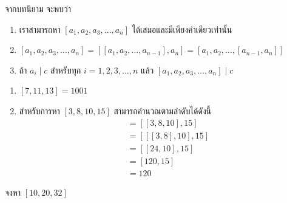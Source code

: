 จากบทนิยาม จะพบว่า
\begin{enumerate}
	\item เราสามารถหา $[a_1, a_2, a_3, \ldots, a_n]$ ได้เสมอและมีเพียงค่าเดียวเท่านั้น
	\item $[a_1, a_2, a_3, \ldots, a_n] = [[a_1, a_2, \ldots, a_{n-1}], a_n] = [a_1, a_2, \ldots, [a_{n-1}, a_n]]$
	\item ถ้า $a_i \mid c$ สำหรับทุก $i = 1, 2, 3, \ldots, n$ แล้ว $[a_1, a_2, a_3, \ldots, a_n] \mid c$
\end{enumerate}

\begin{examplebox}
	\begin{enumerate}
		\item $[7, 11, 13] = 1001$
		\item สำหรับการหา $[3, 8, 10, 15]$ สามารถคำนวณตามลำดับได้ดังนี้
		\begin{align*}
			[3, 8, 10, 15] &= [[3, 8, 10], 15] \\
			&= [[[3, 8], 10], 15] \\
			&= [[24, 10], 15] \\
			&= [120, 15] \\
			&= 120
		\end{align*}
	\end{enumerate}
\end{examplebox}

\begin{examplebox}
	จงหา $[10, 20, 32]$ 
\end{examplebox}
\solution
